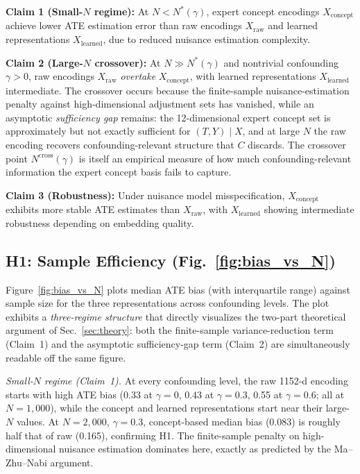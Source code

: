 \documentclass{article}
\begin{document}
\textbf{Claim 1 (Small-$N$ regime):} At $N < N^*(\gamma)$, expert concept encodings
$X_{\text{concept}}$ achieve lower ATE estimation error than raw encodings
$X_{\text{raw}}$ and learned representations $X_{\text{learned}}$, due to reduced
nuisance estimation complexity.

\textbf{Claim 2 (Large-$N$ crossover):} At $N \gg N^*(\gamma)$ and nontrivial
confounding $\gamma > 0$, raw encodings $X_{\text{raw}}$ \emph{overtake}
$X_{\text{concept}}$, with learned representations $X_{\text{learned}}$ intermediate.
The crossover occurs because the finite-sample nuisance-estimation penalty against
high-dimensional adjustment sets has vanished, while an asymptotic \emph{sufficiency
gap} remains: the 12-dimensional expert concept set is approximately but not exactly
sufficient for $(T,Y) \mid X$, and at large $N$ the raw encoding recovers
confounding-relevant structure that $C$ discards. The crossover point
$N^{\text{cross}}(\gamma)$ is itself an empirical measure of how much
confounding-relevant information the expert concept basis fails to capture.

\textbf{Claim 3 (Robustness):} Under nuisance model misspecification,
$X_{\text{concept}}$ exhibits more stable ATE estimates than $X_{\text{raw}}$, with
$X_{\text{learned}}$ showing intermediate robustness depending on embedding quality.

\subsection{H1: Sample Efficiency (Fig.~\ref{fig:bias_vs_N})}
Figure~\ref{fig:bias_vs_N} plots median ATE bias (with interquartile range) against
sample size for the three representations across confounding levels. The plot
exhibits a \emph{three-regime structure} that directly visualizes the two-part
theoretical argument of Sec.~\ref{sec:theory}: both the finite-sample
variance-reduction term (Claim~1) and the asymptotic sufficiency-gap term
(Claim~2) are simultaneously readable off the same figure.

\textit{Small-$N$ regime (Claim~1).} At every confounding level, the raw 1152-d
encoding starts with high ATE bias (0.33 at $\gamma{=}0$, 0.43 at $\gamma{=}0.3$,
0.55 at $\gamma{=}0.6$; all at $N{=}1{,}000$), while the concept and learned
representations start near their large-$N$ values. At $N{=}2{,}000$, $\gamma{=}0.3$,
concept-based median bias (0.083) is roughly half that of raw (0.165), confirming
H1. The finite-sample penalty on high-dimensional nuisance estimation dominates
here, exactly as predicted by the Ma--Zhu--Nabi
argument.\cite{ma2012semiparametric,nabi2022causal}
\end{document}
